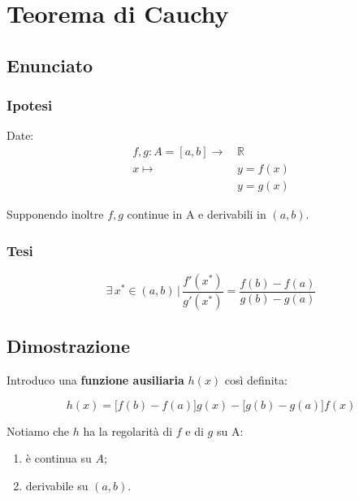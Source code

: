 \documentclass[../dimostrazioni]{subfiles}
\begin{document}
    \chapter{Teorema di Cauchy}
    \label{teoCauchy}

        \section*{Enunciato}

            \subsection*{Ipotesi}

                Date:
                \begin{align*}
                    f,g : A = [a, b] \longrightarrow \, &\mathbb{R}\\
                    x \longmapsto \, &y = f(x)\\
                                  &y = g(x) 
                \end{align*}

                Supponendo inoltre \(f, g\) continue in A e derivabili in \( (a,b) \).

            \subsection*{Tesi}

                \[ 
                    \exists \, x^* \in (a,b) \, | \, \frac{ f'(x^*) }{ g'(x^*) } = \frac{ f(b) - f(a) }{ g(b) - g(a) }
                \]

        \section*{Dimostrazione}

            Introduco una \textbf{funzione ausiliaria} \(h(x)\) così definita:

            \[ 
                h(x) = \big[f(b) - f(a)\big]g(x) - \big[g(b) - g(a)\big]f(x)
            \]

            Notiamo che \(h\) ha la regolarità di \(f\) e di \(g\) su A:
            \begin{enumerate}
                \indentitem \item è continua su \( A \);
                \indentitem \item derivabile su \( (a, b) \).
            \end{enumerate}
\end{document}
